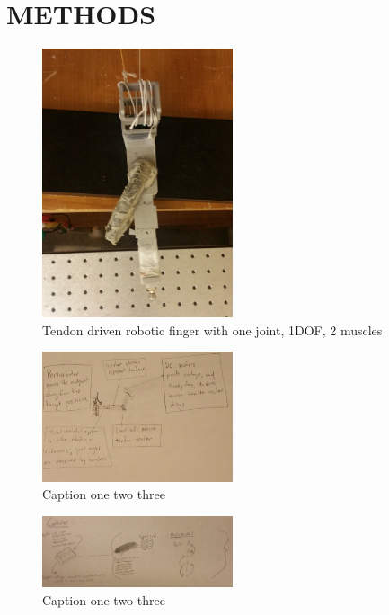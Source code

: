 \section{METHODS}



\begin{figure}[schematic_finger_overhead]
  \label{fig:schematic_finger_overhead}
  \centering
  \includegraphics[width=0.5\textwidth]{figures/overhead_robotic_finger.pdf}
  \caption{Tendon driven robotic finger with one joint, 1DOF, 2 muscles}
\end{figure}

\begin{figure}[hardware_schematic]
  \label{fig:hardware_schematic}
  \centering
  \includegraphics[width=0.5\textwidth]{figures/hardware_schematic.pdf}
  \caption{Caption one two three}
\end{figure}

\begin{figure}[fpga_schematic]
  \label{fig:fpga_schematic}
  \centering
  \includegraphics[width=0.5\textwidth]{figures/fpga_schematic.pdf}
  \caption{Caption one two three}
\end{figure}


